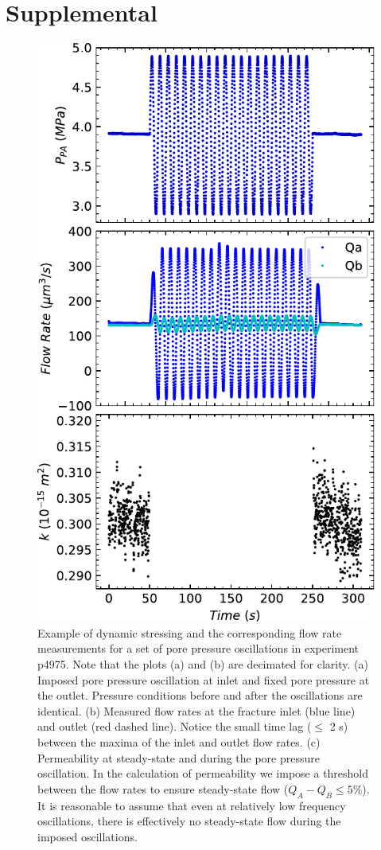 \documentclass[letterpaper,10pt]{article}
\begin{document}

\newcommand{\beginsupplement}{%
	\setcounter{figure}{0}
	\renewcommand{\thefigure}{S\arabic{figure}}%
}

\beginsupplement
\section{Supplemental}
\label{Supp}

\begin{figure}[ht]
	\centering
	\includegraphics[width=0.4\columnwidth]{permCalcPlots_tall_p4975_run3b_1Hz}
	\caption[]{Example of dynamic stressing and the corresponding flow rate measurements for a set of pore pressure oscillations in experiment p4975. Note that the plots (a) and (b) are decimated for clarity. (a) Imposed pore pressure oscillation at inlet and fixed pore pressure at the outlet. Pressure conditions before and after the oscillations are identical. (b) Measured flow rates at the fracture inlet (blue line) and outlet (red dashed line). Notice the small time lag ($\leq$ 2 s) between the maxima of the inlet and outlet flow rates. (c) Permeability at steady-state and during the pore pressure oscillation. In the calculation of permeability we impose a threshold between the flow rates to ensure steady-state flow ($Q_{A} - Q_{B}  \leq 5 \% $). It is reasonable to assume that even at relatively low frequency oscillations, there is effectively no steady-state flow during the imposed oscillations.}
	\label{fig:perm_calc}
\end{figure}
\end{document}
